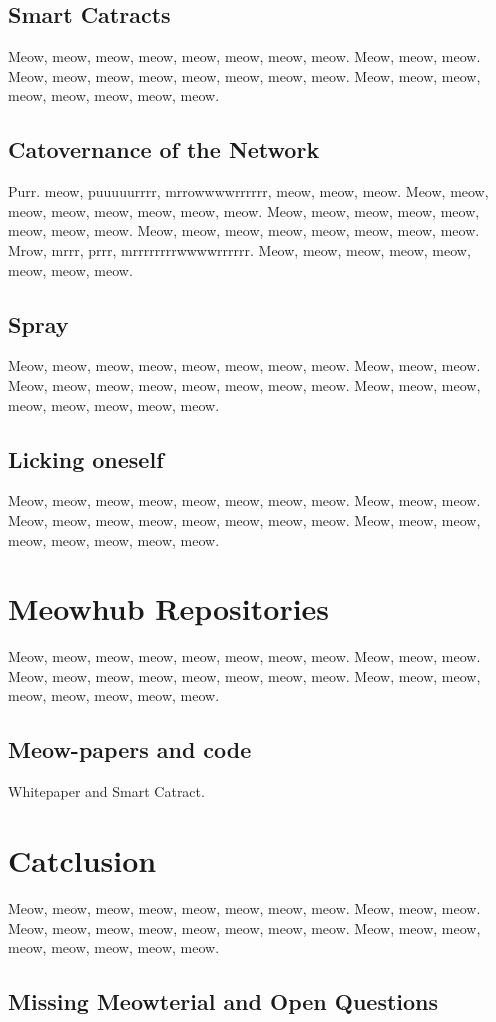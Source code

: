 \documentclass[9pt,oneside]{amsart}
\newcommand*\lipsumeow{Meow, meow, meow, meow, meow, meow, meow, meow.  Meow, meow, meow. Meow, meow, meow, meow, meow, meow, meow, meow. Meow, meow, meow, meow, meow, meow, meow, meow. }
\newcommand*\lipsumeowpurr{Purr. meow, puuuuurrrr, mrrowwwwrrrrrr, meow, meow, meow. Meow, meow, meow, meow, meow, meow, meow, meow. Meow, meow, meow, meow, meow, meow, meow, meow. Meow, meow, meow, meow, meow, meow, meow, meow. Mrow, mrrr, prrr, mrrrrrrrrwwwwrrrrrr. Meow, meow, meow, meow, meow, meow, meow, meow.}
\begin{document}
\begin{multicols}{2}
\subsection{Smart Catracts} \label{subsec:smart_contracts} 
 \lipsumeow{}

\subsection{Catovernance of the Network} \label{subsec:governance} 
 \lipsumeowpurr{}

\subsection{Spray} \label{fees} 
 \lipsumeow{}

\subsection{Licking oneself} \label{privacy} 
 \lipsumeow{}


\section{Meowhub Repositories}\label{sec:protocol} \lipsumeow{}

\subsection{Meow-papers and code}\label{subsec:exchange}
Whitepaper and Smart Catract. \cite{github-compuglobal}


\section{Catclusion} \label{ch:conclusion}

    \lipsumeow{}

\subsection{Missing Meowterial and Open Questions}\label{open-questions-and-further-work}
 

\end{multicols}
\end{document}
